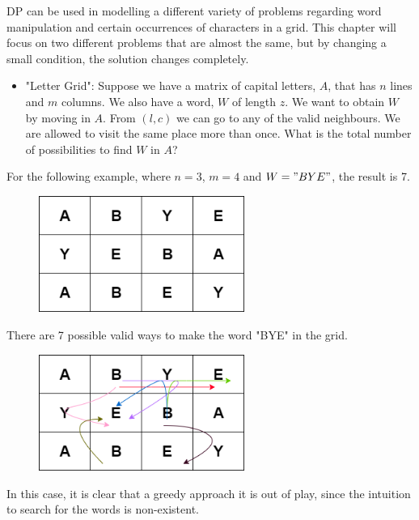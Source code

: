 \documentclass[letterpaper]{article}
\begin{document}
DP can be used in modelling a different variety of problems regarding word manipulation and certain occurrences of characters in a grid. This chapter will focus on two different problems that are almost the same, but by changing a small condition, the solution changes completely.

\begin{itemize}
    \item "Letter Grid": Suppose we have a matrix of capital letters, $A$, that has $n$ lines and $m$ columns. We also have a word, $W$ of length $z$. We want to obtain $W$ by moving in $A$. From $(l, c)$ we can go to any of the valid neighbours. We are allowed to visit the same place more than once. What is the total number of possibilities to find $W$ in $A$?
\end{itemize}

For the following example, where $n = 3$, $m = 4$ and $W = "BYE"$, the result is 7.

\begin{figure} [h!]
\centering
\includegraphics[width=0.60\textwidth]{pngOfDiagrams/dppaths1.png}
\end{figure}

There are 7 possible valid ways to make the word "BYE" in the grid.

\begin{figure} [h!]
\centering
\includegraphics[width=0.60\textwidth]{pngOfDiagrams/dppaths2.png}
\end{figure}

In this case, it is clear that a greedy approach it is out of play, since the intuition to search for the words is non-existent.
\end{document}
